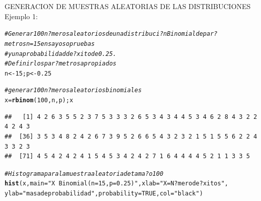 \documentclass[10pt,a4paper]{article}\usepackage[]{graphicx}\usepackage[]{color}
\makeatletter
\newcommand{\hlnum}[1]{\textcolor[rgb]{0.686,0.059,0.569}{#1}}%
\newcommand{\hlstr}[1]{\textcolor[rgb]{0.192,0.494,0.8}{#1}}%
\newcommand{\hlcom}[1]{\textcolor[rgb]{0.678,0.584,0.686}{\textit{#1}}}%
\newcommand{\hlstd}[1]{\textcolor[rgb]{0.345,0.345,0.345}{#1}}%
\newcommand{\hlkwb}[1]{\textcolor[rgb]{0.69,0.353,0.396}{#1}}%
\newcommand{\hlkwc}[1]{\textcolor[rgb]{0.333,0.667,0.333}{#1}}%
\newcommand{\hlkwd}[1]{\textcolor[rgb]{0.737,0.353,0.396}{\textbf{#1}}}%
\newenvironment{kframe}{%
 \def\at@end@of@kframe{}%
 \ifinner\ifhmode%
  \def\at@end@of@kframe{\end{minipage}}%
  \begin{minipage}{\columnwidth}%
 \fi\fi%
 \def\FrameCommand##1{\hskip\@totalleftmargin \hskip-\fboxsep
 \colorbox{shadecolor}{##1}\hskip-\fboxsep
     \hskip-\linewidth \hskip-\@totalleftmargin \hskip\columnwidth}%
 \MakeFramed {\advance\hsize-\width
   \@totalleftmargin\z@ \linewidth\hsize
   \@setminipage}}%
 {\par\unskip\endMakeFramed%
 \at@end@of@kframe}
\newenvironment{knitrout}{}{} %
\makeatother
\begin{document}
GENERACION DE MUESTRAS ALEATORIAS DE LAS DISTRIBUCIONES 
Ejemplo 1: 
\begin{knitrout}
\color{fgcolor}\begin{kframe}
\begin{alltt}
\hlcom{#Generar 100 n?meros aleatorios de una distribuci?n Binomial de par?metros n= 15 ensayos o pruebas }
\hlcom{#y una probabilidad de ?xito de 0.25. }
\hlcom{# Definir los par?metros apropiados }
\hlstd{n} \hlkwb{<-} \hlnum{15}\hlstd{; p} \hlkwb{<-} \hlnum{0.25}

\hlcom{# generar 100 n?meros aleatorios binomiales }
\hlstd{x} \hlkwb{=} \hlkwd{rbinom}\hlstd{(}\hlnum{100}\hlstd{, n, p); x}
\end{alltt}
\begin{verbatim}
##   [1] 4 2 6 3 5 5 2 3 7 5 3 3 3 2 6 5 3 4 3 4 4 5 3 4 6 2 8 4 3 2 2 4 2 4 3
##  [36] 3 5 3 4 8 2 4 2 6 7 3 9 5 2 6 6 5 4 3 2 3 2 1 5 1 5 5 6 2 2 4 3 3 2 3
##  [71] 4 5 4 2 4 2 4 1 5 4 5 3 4 2 4 2 7 1 6 4 4 4 4 5 2 1 1 3 3 5
\end{verbatim}
\begin{alltt}
\hlcom{# Histograma para la muestra aleatoria de tama?o 100 }
\hlkwd{hist}\hlstd{(x,} \hlkwc{main}\hlstd{=}\hlstr{"X ~ Binomial(n=15, p=0.25)"}\hlstd{,} \hlkwc{xlab}\hlstd{=}\hlstr{"X = N?mero de ?xitos"}\hlstd{,}
\hlkwc{ylab}\hlstd{=}\hlstr{"masa de probabilidad"}\hlstd{,} \hlkwc{probability}\hlstd{=}\hlnum{TRUE}\hlstd{,} \hlkwc{col}\hlstd{=}\hlstr{"black"}\hlstd{)}


\end{alltt}
\end{kframe}
\end{knitrout}
\end{document}

